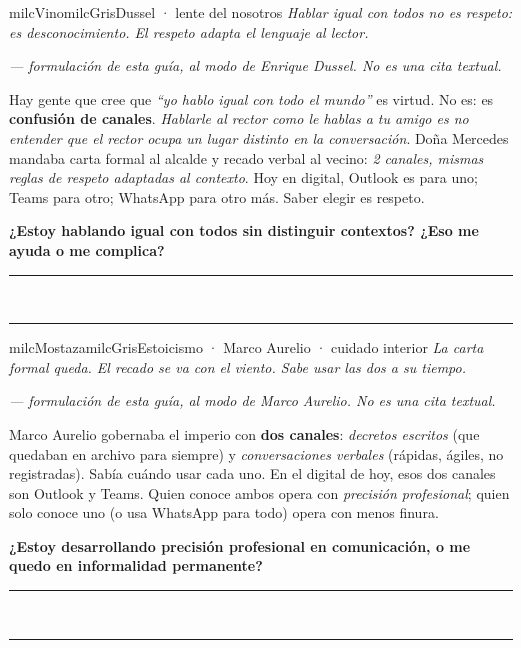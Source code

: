 \documentclass[11pt,letterpaper]{article}
\newcommand{\linead}[1]{\noindent\color{milcLinea}\rule{#1}{0.5pt}\color{milcNegro}}
\begin{document}
\begin{softbox}{milcVino}{milcGris}{Dussel · lente del nosotros}
\textit{Hablar igual con todos no es respeto: es desconocimiento. El respeto adapta el lenguaje al lector.}

{\footnotesize\itshape\color{milcNegro!70}--- formulación de esta guía, al modo de Enrique Dussel. No es una cita textual.}

Hay gente que cree que \emph{``yo hablo igual con todo el mundo''} es virtud. No es: es \textbf{confusión de canales}. \emph{Hablarle al rector como le hablas a tu amigo es no entender que el rector ocupa un lugar distinto en la conversación}. Doña Mercedes mandaba carta formal al alcalde y recado verbal al vecino: \emph{2 canales, mismas reglas de respeto adaptadas al contexto}. Hoy en digital, Outlook es para uno; Teams para otro; WhatsApp para otro más. Saber elegir es respeto.

\textbf{¿Estoy hablando igual con todos sin distinguir contextos? ¿Eso me ayuda o me complica?}
\end{softbox}
\linead{\linewidth}\\[1mm]
\linead{\linewidth}

\begin{softbox}{milcMostaza}{milcGris}{Estoicismo · Marco Aurelio · cuidado interior}
\textit{La carta formal queda. El recado se va con el viento. Sabe usar las dos a su tiempo.}

{\footnotesize\itshape\color{milcNegro!70}--- formulación de esta guía, al modo de Marco Aurelio. No es una cita textual.}

Marco Aurelio gobernaba el imperio con \textbf{dos canales}: \emph{decretos escritos} (que quedaban en archivo para siempre) y \emph{conversaciones verbales} (rápidas, ágiles, no registradas). Sabía cuándo usar cada uno. En el digital de hoy, esos dos canales son Outlook y Teams. Quien conoce ambos opera con \emph{precisión profesional}; quien solo conoce uno (o usa WhatsApp para todo) opera con menos finura.

\textbf{¿Estoy desarrollando precisión profesional en comunicación, o me quedo en informalidad permanente?}
\end{softbox}
\linead{\linewidth}\\[1mm]
\linead{\linewidth}
\end{document}
